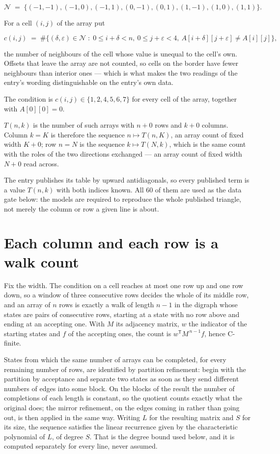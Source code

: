 \documentclass[11pt]{article}
\theoremstyle{definition}
\begin{document}
\[\mathcal{N} \;=\; \{(-1,-1), (-1,0), (-1,1), (0,-1), (0,1), (1,-1), (1,0), (1,1)\}.\]

For a cell $(i,j)$ of the array put

\[c(i,j) \;=\; \#\bigl\{(\delta,\varepsilon)\in\mathcal{N} \;:\; 0\le i+\delta<n,\ 0\le j+\varepsilon<4,\ A[i+\delta][j+\varepsilon] \neq A[i][j]\bigr\},\]

the number of neighbours of the cell whose value is unequal to the cell's own. Offsets that leave the array are not counted, so cells on the border have fewer neighbours than interior ones --- which is what makes the two readings of the entry's wording distinguishable on the entry's own data.

The condition is $c(i,j) \in \{1, 2, 4, 5, 6, 7\}$ for every cell of the array, together with $A[0][0]=0$.

$T(n,k)$ is the number of such arrays with $n + 0$ rows and $k + 0$ columns. Column $k = K$ is therefore the sequence $n \mapsto T(n,K)$, an array count of fixed width $K + 0$; row $n = N$ is the sequence $k \mapsto T(N,k)$, which is the same count with the roles of the two directions exchanged --- an array count of fixed width $N + 0$ read across.

The entry publishes its table by upward antidiagonals, so every published term is a value $T(n,k)$ with both indices known. All 60 of them are used as the data gate below: the models are required to reproduce the whole published triangle, not merely the column or row a given line is about.

\section{Each column and each row is a walk count}

Fix the width. The condition on a cell reaches at most one row up and one row down, so a window of three consecutive rows decides the whole of its middle row, and an array of $n$ rows is exactly a walk of length $n-1$ in the digraph whose states are pairs of consecutive rows, starting at a state with no row above and ending at an accepting one. With $M$ its adjacency matrix, $w$ the indicator of the starting states and $f$ of the accepting ones, the count is $w^{\mathsf T}M^{\,n-1}f$, hence C-finite.

States from which the same number of arrays can be completed, for every remaining number of rows, are identified by partition refinement: begin with the partition by acceptance and separate two states as soon as they send different numbers of edges into some block. On the blocks of the result the number of completions of each length is constant, so the quotient counts exactly what the original does; the mirror refinement, on the edges coming in rather than going out, is then applied in the same way. Writing $L$ for the resulting matrix and $S$ for its size, the sequence satisfies the linear recurrence given by the characteristic polynomial of $L$, of degree $S$. That is the degree bound used below, and it is computed separately for every line, never assumed.
\end{document}
